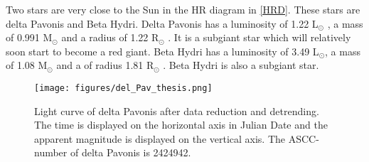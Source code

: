 \documentclass{aa}
\begin{document}



Two stars are very close to the Sun in the HR diagram in \ref{HRD}. These stars are delta Pavonis and Beta Hydri.
%
Delta Pavonis has a luminosity of 1.22 L$_\odot$ \citep{Bruntt_2010}, a mass of 0.991 M$_\odot$ and a radius of 1.22 R$_\odot$ \citep{2008yCat..21680297T}.
%
It is a subgiant star which will relatively soon start to become a red giant.
%
Beta Hydri has a luminosity of 3.49 L$_\odot$, a mass of 1.08 M$_\odot$ and a of radius 1.81 R$_\odot$ \citep{Brand_o_2011}.
%
Beta Hydri is also a subgiant star. 

\begin{figure}
    \centering
    \texttt{[image: figures/del\_Pav\_thesis.png]}
    \caption{Light curve of delta Pavonis after data reduction and detrending. The time is displayed on the horizontal axis in Julian Date and the apparent magnitude is displayed on the vertical axis. The ASCC-number of delta Pavonis is 2424942.}
    \label{del_Pav}
\end{figure}
\end{document}
